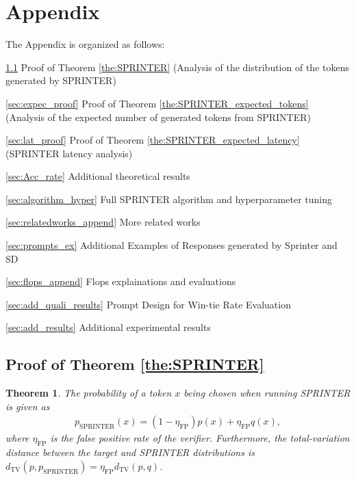 \documentclass{article}
\theoremstyle{plain}
\newtheorem{theorem}{Theorem}[section]
\theoremstyle{definition}
\theoremstyle{remark}
\begin{document}
\section{Appendix}
The Appendix is organized as follows: 

\ref{sec:31proof} Proof of Theorem \ref{the:SPRINTER} (Analysis of the distribution of the tokens generated by
SPRINTER)

\ref{sec:expec_proof} Proof of Theorem \ref{the:SPRINTER_expected_tokens} (Analysis of the expected number of generated tokens from SPRINTER)

\ref{sec:lat_proof} Proof of Theorem \ref{the:SPRINTER_expected_latency} (SPRINTER latency analysis)

\ref{sec:Acc_rate} Additional theoretical results

\ref{sec:algorithm_hyper} Full SPRINTER algorithm and hyperparameter tuning

\ref{sec:relatedworks_append} More related works

\ref{sec:prompts_ex} Additional Examples of Responses generated by Sprinter and SD

\ref{sec:flops_append} Flops explainations and evaluations

\ref{sec:add_quali_results} Prompt Design for Win-tie Rate Evaluation

\ref{sec:add_results} Additional experimental results 


\subsection{Proof of Theorem \ref{the:SPRINTER} }
\label{sec:31proof}
\begingroup
\renewcommand{\thetheorem}{\ref{the:SPRINTER}} %
\begin{theorem}
The probability of a token $x$ being chosen when running SPRINTER is given as
    \begin{align}
    \label{eq:SPRINT_DIST}
        p_\text{SPRINTER}(x) = (1-\eta_\text{FP})p(x) + \eta_\text{FP} q(x),
    \end{align}
    where $\eta_\text{FP}$ is the false positive rate of the verifier. Furthermore, the total-variation distance between the target and SPRINTER distributions is $d_\text{TV}(p,p_\text{SPRINTER}) = \eta_\text{FP}d_\text{TV}(p,q)$.
\end{theorem}
\endgroup

\end{document}
